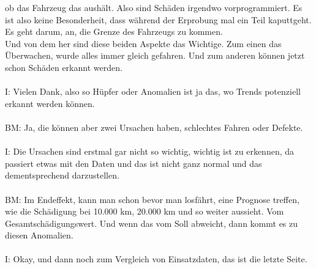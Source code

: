 \begin{linenumbers}
ob das Fahrzeug das aushält. Also sind Schäden irgendwo vorprogrammiert. Es ist also keine Besonderheit, dass während der Erprobung mal ein Teil kaputtgeht. Es geht darum, an, die Grenze des Fahrzeugs zu kommen.\\ Und von dem her sind diese beiden Aspekte das Wichtige. Zum einen das Überwachen, wurde alles immer gleich gefahren. Und zum anderen können jetzt schon Schäden erkannt werden.\\\\ 
I: Vielen Dank, also so Hüpfer oder Anomalien ist ja das, wo Trends potenziell erkannt werden können.\\\\
BM: Ja, die können aber zwei Ursachen haben, schlechtes Fahren oder Defekte.\\\\
I: Die Ursachen sind erstmal gar nicht so wichtig, wichtig ist zu erkennen, da passiert etwas mit den Daten und das ist nicht ganz normal und das dementsprechend darzustellen.\\\\
BM: Im Endeffekt, kann man schon bevor man losfährt, eine Prognose treffen, wie die Schädigung bei 10.000 km, 20.000 km und so weiter aussieht. Vom Gesamtschädigungswert. Und wenn das vom Soll abweicht, dann kommt es zu diesen Anomalien.\\\\
I: Okay, und dann noch zum Vergleich von Einsatzdaten, das ist die letzte Seite.\\\\

\end{linenumbers}
